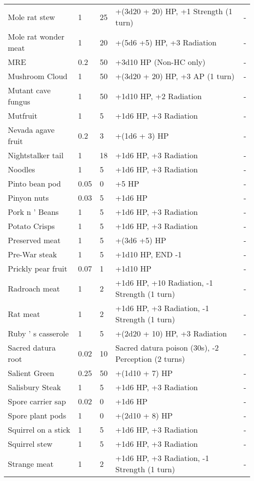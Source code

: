\documentclass{report}
\begin{document}
\begin{table}[H]
\begin{table}[H]
\begin{table}[H]
\begin{table}[H]
\begin{table}[H]
\begin{table}[H]
\begin{table}[H]
\begin{table}[H]
\begin{table}[H]
\begin{table}[H]
\begin{table}[H]
\begin{table}[H]
\begin{table}[H]
\begin{table}[H]
\begin{table}[H]
\begin{tabular}{p{30mm}p{30mm}p{30mm}p{30mm}p{30mm}}
Mole rat stew  & 1 & 25 & +(3d20 + 20) HP, +1 Strength (1 turn)  & -  \\
Mole rat wonder meat  & 1 & 20 & +(5d6 +5) HP, +3 Radiation  & -  \\
MRE  & 0.2  & 50 & +3d10 HP (Non-HC only)  & -  \\
Mushroom Cloud  & 1 & 50 & +(3d20 + 20) HP, +3 AP (1 turn)  & -  \\
Mutant cave fungus  & 1 & 50 & +1d10 HP, +2 Radiation  & -  \\
Mutfruit  & 1 & 5 & +1d6 HP, +3 Radiation  & -  \\
Nevada agave fruit  & 0.2  & 3 & +(1d6 + 3) HP  & -  \\
Nightstalker tail  & 1 & 18 & +1d6 HP, +3 Radiation  & -  \\
Noodles  & 1 & 5 & +1d6 HP, +3 Radiation  & -  \\
Pinto bean pod  & 0.05  & 0 & +5 HP  & -  \\
Pinyon nuts  & 0.03  & 5 & +1d6 HP  & -  \\
Pork n '  Beans  & 1 & 5 & +1d6 HP, +3 Radiation  & -  \\
Potato Crisps  & 1 & 5 & +1d6 HP, +3 Radiation  & -  \\
Preserved meat  & 1 & 5 & +(3d6 +5) HP  & -  \\
Pre-War steak  & 1 & 5 & +1d10 HP, END -1  & -  \\
Prickly pear fruit  & 0.07  & 1 & +1d10 HP  & -  \\
Radroach meat  & 1 & 2 & +1d6 HP, +10 Radiation, -1 Strength (1 turn)  & -  \\
Rat meat  & 1 & 2 & +1d6 HP, +3 Radiation, -1 Strength (1 turn)  & -  \\
Ruby ' s casserole  & 1 & 5 & +(2d20 + 10) HP, +3 Radiation  & -  \\
Sacred datura root  & 0.02  & 10 & Sacred datura poison (30s), -2 Perception (2 turns)  & -  \\
Salient Green  & 0.25  & 50 & +(1d10 + 7) HP  & -  \\
Salisbury Steak  & 1 & 5 & +1d6 HP, +3 Radiation  & -  \\
Spore carrier sap  & 0.02  & 0 & +1d6 HP  & -  \\
Spore plant pods  & 1 & 0 & +(2d10 + 8) HP  & -  \\
Squirrel on a stick  & 1 & 5 & +1d6 HP, +3 Radiation  & -  \\
Squirrel stew  & 1 & 5 & +1d6 HP, +3 Radiation  & -  \\
Strange meat  & 1 & 2 & +1d6 HP, +3 Radiation, -1 Strength (1 turn)  & -  \\

\end{tabular}
\end{table}
\end{table}
\end{table}
\end{table}
\end{table}
\end{table}
\end{table}
\end{table}
\end{table}
\end{table}
\end{table}
\end{table}
\end{table}
\end{table}
\end{table}
\end{document}
